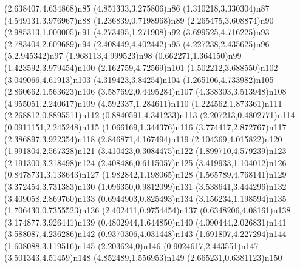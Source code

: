 \pnode(2.638407,4.634868){n85}
\pnode(4.851333,3.275806){n86}
\pnode(1.310218,3.330304){n87}
\pnode(4.549131,3.976967){n88}
\pnode(1.236839,0.7198968){n89}
\pnode(2.265475,3.608874){n90}
\pnode(2.985313,1.000005){n91}
\pnode(4.273495,1.271908){n92}
\pnode(3.699525,4.716225){n93}
\pnode(2.783404,2.609689){n94}
\pnode(2.408449,4.402442){n95}
\pnode(4.227238,2.435625){n96}
\pnode(5,2.945342){n97}
\pnode(1.968113,4.999523){n98}
\pnode(0.662271,1.364150){n99}
\pnode(1.423592,3.979454){n100}
\pnode(2.162759,4.72569){n101}
\pnode(1.502212,3.688550){n102}
\pnode(3.049066,4.61913){n103}
\pnode(4.319423,3.84254){n104}
\pnode(1.265106,4.733982){n105}
\pnode(2.860662,1.563623){n106}
\pnode(3.587692,0.4495284){n107}
\pnode(4.338303,3.513948){n108}
\pnode(4.955051,2.240617){n109}
\pnode(4.592337,1.284611){n110}
\pnode(1.224562,1.873361){n111}
\pnode(2.268812,0.8895511){n112}
\pnode(0.8840591,4.341233){n113}
\pnode(2.207213,0.4802771){n114}
\pnode(0.0911151,2.245248){n115}
\pnode(1.066169,1.344376){n116}
\pnode(3.774417,2.872767){n117}
\pnode(2.386897,3.922354){n118}
\pnode(2.846871,4.167494){n119}
\pnode(2.104369,4.015822){n120}
\pnode(1.991804,2.567328){n121}
\pnode(3.410423,0.3084475){n122}
\pnode(1.899710,4.579239){n123}
\pnode(2.191300,3.218498){n124}
\pnode(2.408486,0.6115057){n125}
\pnode(3.419933,1.104012){n126}
\pnode(0.8478731,3.138643){n127}
\pnode(1.982842,1.198065){n128}
\pnode(1.565789,4.768141){n129}
\pnode(3.372454,3.731383){n130}
\pnode(1.096350,0.9812099){n131}
\pnode(3.538641,3.444296){n132}
\pnode(3.409058,2.869760){n133}
\pnode(0.6944903,0.825493){n134}
\pnode(3.156234,1.198594){n135}
\pnode(1.706430,0.7355523){n136}
\pnode(2.402411,0.9754454){n137}
\pnode(0.6348206,4.08161){n138}
\pnode(3.174877,3.926441){n139}
\pnode(0.4802944,1.644850){n140}
\pnode(4.090444,2.026831){n141}
\pnode(3.588087,4.236286){n142}
\pnode(0.9370306,4.031448){n143}
\pnode(1.691807,4.227294){n144}
\pnode(1.608088,3.119516){n145}
\pnode(2.203624,0){n146}
\pnode(0.9024617,2.443551){n147}
\pnode(3.501343,4.51459){n148}
\pnode(4.852489,1.556953){n149}
\pnode(2.665231,0.6381123){n150}
